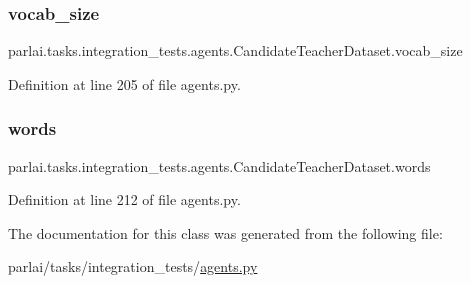 \subsubsection{\texorpdfstring{vocab\+\_\+size}{vocab\_size}}
{\footnotesize\ttfamily parlai.\+tasks.\+integration\+\_\+tests.\+agents.\+Candidate\+Teacher\+Dataset.\+vocab\+\_\+size}



Definition at line 205 of file agents.\+py.

\mbox{\label{classparlai_1_1tasks_1_1integration__tests_1_1agents_1_1CandidateTeacherDataset_a4fa5d42ab75aede531e793b548f601ce}} 
\subsubsection{\texorpdfstring{words}{words}}
{\footnotesize\ttfamily parlai.\+tasks.\+integration\+\_\+tests.\+agents.\+Candidate\+Teacher\+Dataset.\+words}



Definition at line 212 of file agents.\+py.



The documentation for this class was generated from the following file\+:\begin{DoxyCompactItemize}
\item 
parlai/tasks/integration\+\_\+tests/\hyperlink{parlai_2tasks_2integration__tests_2agents_8py}{agents.\+py}\end{DoxyCompactItemize}
